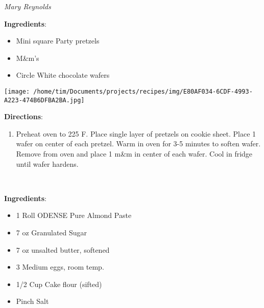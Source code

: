 \documentclass[11pt, twoside, openany]{book}
\begin{document}
 \label{bunco-bites}\hfill\textit{Mary Reynolds}\\
\begin{minipage}[t]{0.8\linewidth}
\textbf{Ingredients}:\vspace{-3mm}
\begin{multicols}{2}
\begin{itemize}\setlength\itemsep{-1mm}
\item Mini square Party pretzels
\item M&m's
\item Circle White chocolate wafers
\end{itemize}
\end{multicols}
\end{minipage}
\begin{minipage}[t]{0.2\linewidth}
\centering \strut\vspace*{-\baselineskip}\newline
\texttt{[image: /home/tim/Documents/projects/recipes/img/E80AF034-6CDF-4993-A223-474B6DFBA2BA.jpg]}\\
\end{minipage}\vspace{3mm}
\textbf{Directions}:
\vspace{-3mm}\begin{enumerate}\setlength\itemsep{-1mm}
\item Preheat oven to 225 F. Place single layer of pretzels on cookie sheet. Place 1 wafer on center of each pretzel. Warm in oven for 3-5 minutes to soften wafer. Remove from oven and place 1 m&m in center of each wafer. Cool in fridge until wafer hardens.
\end{enumerate}
 \label{frangipan-(luxury-almond-cake)}\hfill\textit{}\\
\begin{minipage}[t]{0.8\linewidth}
\textbf{Ingredients}:\vspace{-3mm}
\begin{multicols}{2}
\begin{itemize}\setlength\itemsep{-1mm}
\item 1 Roll ODENSE Pure Almond Paste
\item 7 oz Granulated Sugar
\item 7 oz unsalted butter, softened
\item 3 Medium eggs, room temp.
\item 1/2 Cup Cake flour (sifted)
\item Pinch Salt
\end{itemize}
\end{multicols}
\end{minipage}
\end{document}
